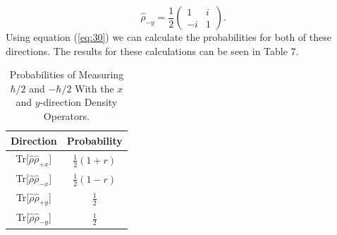 \documentclass[twocolumn]{article}
\begin{document}
\begin{equation} \label{eq:35}
\hat{\rho}_{-y}=\frac{1}{2}
\begin{pmatrix}
1 & i \\
-i & 1
\end{pmatrix}.
\end{equation}
Using equation (\ref{eq:30}) we can calculate the probabilities for both of these directions. The results for these calculations can be seen in Table 7.
\begin{table}[h!]
\begin{center}
\begin{tabular}{ |c|c| }
\hline Direction & Probability \\
\hline Tr[$\hat{\rho}\hat{\rho}_{+x}$] & $\frac{1}{2}(1+r)$ \\
\hline Tr[$\hat{\rho}\hat{\rho}_{-x}$] & $\frac{1}{2}(1-r)$ \\
\hline Tr[$\hat{\rho}\hat{\rho}_{+y}$] & $\frac{1}{2}$ \\
\hline Tr[$\hat{\rho}\hat{\rho}_{-y}$] & $\frac{1}{2}$ \\
\hline
\end{tabular} 
\caption{Probabilities of Measuring $\hbar/2$ and $-\hbar/2$ With the $x$ and $y$-direction Density Operators.}
\end{center}
\end{table} \\
\end{document}
